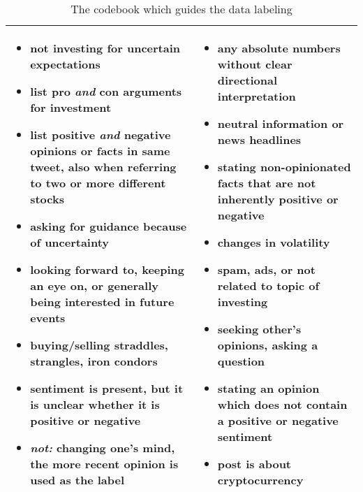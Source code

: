 \begin{table}[!ht]
\begin{tabular}{p{7.5cm}p{7.5cm}}
\begin{itemize}[noitemsep,leftmargin=*,topsep=-12pt]
	\item not investing for uncertain expectations
	\item list pro \emph{and} con arguments for investment
	\item list positive \emph{and} negative opinions or facts in same tweet, also when referring to two or more different stocks
	\item asking for guidance because of uncertainty
	\item looking forward to, keeping an eye on, or generally being interested in future events
	\item buying/selling straddles, strangles, iron condors
	\item sentiment is present, but it is unclear whether it is positive or negative
	\item \emph{not:} changing one's mind, the more recent opinion is used as the label

\end{itemize} & \begin{itemize}[noitemsep,leftmargin=*,topsep=-12pt]
	\item any absolute numbers without clear directional interpretation
	\item neutral information or news headlines
	\item stating non-opinionated facts that are not inherently positive or negative
	\item changes in volatility
	\item spam, ads, or not related to topic of investing
	\item seeking other's opinions, asking a question
	\item stating an opinion which does not contain a positive or negative sentiment
	\item post is about cryptocurrency
\end{itemize}\\

\bottomrule
\end{tabular}
\caption{The codebook which guides the data labeling}
\label{table-codebook}
\end{table}